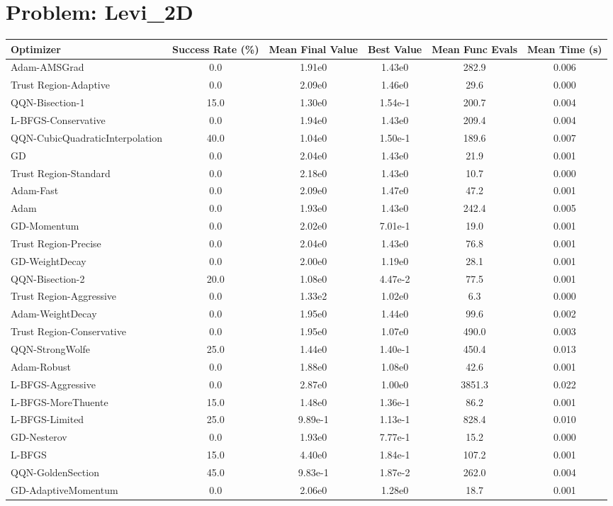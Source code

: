 \documentclass{article}
\begin{document}
\section{Problem: Levi\_2D}
\begin{longtable}{p{3cm}*{5}{c}}
\toprule
\textbf{Optimizer} & \textbf{Success Rate (\%)} & \textbf{Mean Final Value} & \textbf{Best Value} & \textbf{Mean Func Evals} & \textbf{Mean Time (s)} \\
\midrule
Adam-AMSGrad & 0.0 & 1.91e0 & 1.43e0 & 282.9 & 0.006 \\
Trust Region-Adaptive & 0.0 & 2.09e0 & 1.46e0 & 29.6 & 0.000 \\
QQN-Bisection-1 & 15.0 & 1.30e0 & 1.54e-1 & 200.7 & 0.004 \\
L-BFGS-Conservative & 0.0 & 1.94e0 & 1.43e0 & 209.4 & 0.004 \\
QQN-CubicQuadraticInterpolation & 40.0 & 1.04e0 & 1.50e-1 & 189.6 & 0.007 \\
GD & 0.0 & 2.04e0 & 1.43e0 & 21.9 & 0.001 \\
Trust Region-Standard & 0.0 & 2.18e0 & 1.43e0 & 10.7 & 0.000 \\
Adam-Fast & 0.0 & 2.09e0 & 1.47e0 & 47.2 & 0.001 \\
Adam & 0.0 & 1.93e0 & 1.43e0 & 242.4 & 0.005 \\
GD-Momentum & 0.0 & 2.02e0 & 7.01e-1 & 19.0 & 0.001 \\
Trust Region-Precise & 0.0 & 2.04e0 & 1.43e0 & 76.8 & 0.001 \\
GD-WeightDecay & 0.0 & 2.00e0 & 1.19e0 & 28.1 & 0.001 \\
QQN-Bisection-2 & 20.0 & 1.08e0 & 4.47e-2 & 77.5 & 0.001 \\
Trust Region-Aggressive & 0.0 & 1.33e2 & 1.02e0 & 6.3 & 0.000 \\
Adam-WeightDecay & 0.0 & 1.95e0 & 1.44e0 & 99.6 & 0.002 \\
Trust Region-Conservative & 0.0 & 1.95e0 & 1.07e0 & 490.0 & 0.003 \\
QQN-StrongWolfe & 25.0 & 1.44e0 & 1.40e-1 & 450.4 & 0.013 \\
Adam-Robust & 0.0 & 1.88e0 & 1.08e0 & 42.6 & 0.001 \\
L-BFGS-Aggressive & 0.0 & 2.87e0 & 1.00e0 & 3851.3 & 0.022 \\
L-BFGS-MoreThuente & 15.0 & 1.48e0 & 1.36e-1 & 86.2 & 0.001 \\
L-BFGS-Limited & 25.0 & 9.89e-1 & 1.13e-1 & 828.4 & 0.010 \\
GD-Nesterov & 0.0 & 1.93e0 & 7.77e-1 & 15.2 & 0.000 \\
L-BFGS & 15.0 & 4.40e0 & 1.84e-1 & 107.2 & 0.001 \\
QQN-GoldenSection & 45.0 & 9.83e-1 & 1.87e-2 & 262.0 & 0.004 \\
GD-AdaptiveMomentum & 0.0 & 2.06e0 & 1.28e0 & 18.7 & 0.001 \\
\bottomrule
\end{longtable}
\end{document}
